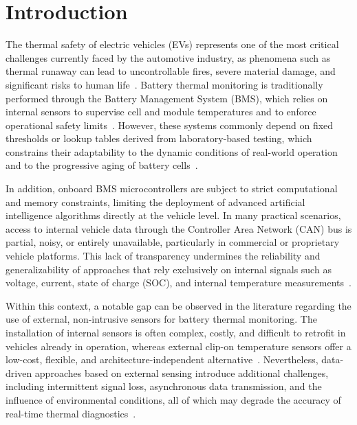 \documentclass[runningheads]{llncs}
\begin{document}
\section{Introduction}
\label{sec:intro}

The thermal safety of electric vehicles (EVs) represents one of the most critical challenges currently faced by the automotive industry, as phenomena such as thermal runaway can lead to uncontrollable fires, severe material damage, and significant risks to human life~\cite{feng2018thermal,yang20196077,togun2025comprehensive}. Battery thermal monitoring is traditionally performed through the Battery Management System (BMS), which relies on internal sensors to supervise cell and module temperatures and to enforce operational safety limits~\cite{togun2025comprehensive,yang20196077}. However, these systems commonly depend on fixed thresholds or lookup tables derived from laboratory-based testing, which constrains their adaptability to the dynamic conditions of real-world operation and to the progressive aging of battery cells~\cite{yang20196077,li2023thermal,li2021datadriven}.

In addition, onboard BMS microcontrollers are subject to strict computational and memory constraints, limiting the deployment of advanced artificial intelligence algorithms directly at the vehicle level. In many practical scenarios, access to internal vehicle data through the Controller Area Network (CAN) bus is partial, noisy, or entirely unavailable, particularly in commercial or proprietary vehicle platforms. This lack of transparency undermines the reliability and generalizability of approaches that rely exclusively on internal signals such as voltage, current, state of charge (SOC), and internal temperature measurements~\cite{li2023thermal,li2021datadriven}.

Within this context, a notable gap can be observed in the literature regarding the use of external, non-intrusive sensors for battery thermal monitoring. The installation of internal sensors is often complex, costly, and difficult to retrofit in vehicles already in operation, whereas external clip-on temperature sensors offer a low-cost, flexible, and architecture-independent alternative~\cite{yang20196077,togun2025comprehensive,li2023thermal}. Nevertheless, data-driven approaches based on external sensing introduce additional challenges, including intermittent signal loss, asynchronous data transmission, and the influence of environmental conditions, all of which may degrade the accuracy of real-time thermal diagnostics~\cite{li2021datadriven,li2023thermal}.
\end{document}
